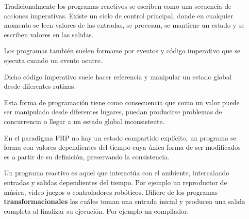 
Tradicionalmente los programas reactivos
se escriben como una secuencia de acciones imperativas.
Existe un ciclo de control principal, donde en cualquier
momento se leen valores de las entradas, se procesan,
se mantiene un estado y se escriben valores en las salidas.

Los programas también suelen formarse por eventos
y código imperativo que se ejecuta cuando un evento ocurre.

Dicho código imperativo suele hacer referencia y manipular
un estado global desde diferentes rutinas.

Esta forma de programación tiene como consecuencia que
como un valor puede ser manipulado desde diferentes lugares,
puedan producirse problemas de concurrencia o llegar a un
estado global inconsistente.

En el paradigma FRP no hay un estado compartido explícito,
un programa se forma con valores dependientes del tiempo
cuya única forma de ser modificados
es a partir de su definición, preservando la consistencia.

  Un programa reactivo es aquel que interactúa con el ambiente,
intercalando entradas y salidas dependientes del tiempo.
  Por ejemplo un reproductor de música, video juegos o
controladores robóticos.
  Difiere de los programas \textbf{transformacionales} los cuáles
toman una entrada inicial y producen una salida
completa al finalizar su ejecución. Por ejemplo un compilador.

